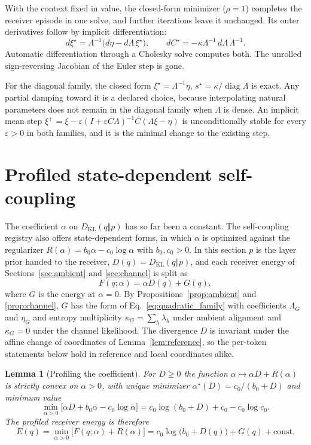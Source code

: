\documentclass[11pt]{article}
\newtheorem{lemma}[proposition]{Lemma}
\theoremstyle{definition}
\theoremstyle{remark}
\newcommand{\KL}{D_{\mathrm{KL}}}
\newcommand{\diag}{\operatorname{diag}}
\begin{document}
With the context fixed in value, the closed-form minimizer ($\rho=1$) completes the receiver episode in one solve, and further iterations leave it unchanged. Its outer derivatives follow by implicit differentiation:
\begin{equation}
d\xi^\star=\Lambda^{-1}\bigl(d\eta-d\Lambda\,\xi^\star\bigr),\qquad dC^\star=-\kappa\Lambda^{-1}\,d\Lambda\,\Lambda^{-1}.
\end{equation}
Automatic differentiation through a Cholesky solve computes both. The unrolled sign-reversing Jacobian of the Euler step is gone.

For the diagonal family, the closed form $\xi^\star=\Lambda^{-1}\eta$, $s^\star=\kappa/\diag\Lambda$ is exact. Any partial damping toward it is a declared choice, because interpolating natural parameters does not remain in the diagonal family when $\Lambda$ is dense. An implicit mean step $\xi^+=\xi-\varepsilon(I+\varepsilon C\Lambda)^{-1}C(\Lambda\xi-\eta)$ is unconditionally stable for every $\varepsilon>0$ in both families, and it is the minimal change to the existing step.

\section{Profiled state-dependent self-coupling}
\label{sec:profiled}

The coefficient $\alpha$ on $\KL(q\Vert p)$ has so far been a constant. The self-coupling registry also offers state-dependent forms, in which $\alpha$ is optimized against the regularizer $R(\alpha)=b_0\alpha-c_0\log\alpha$ with $b_0,c_0>0$. In this section $p$ is the layer prior handed to the receiver, $D(q)=\KL(q\Vert p)$, and each receiver energy of Sections~\ref{sec:ambient} and \ref{sec:channel} is split as
\begin{equation}
F(q;\alpha)=\alpha D(q)+G(q),
\label{eq:split}
\end{equation}
where $G$ is the energy at $\alpha=0$. By Propositions~\ref{prop:ambient} and \ref{prop:channel}, $G$ has the form of Eq.~\eqref{eq:quadratic_family} with coefficients $\Lambda_G$ and $\eta_G$ and entropy multiplicity $\kappa_G=\sum_h\lambda_h$ under ambient alignment and $\kappa_G=0$ under the channel likelihood. The divergence $D$ is invariant under the affine change of coordinates of Lemma~\ref{lem:reference}, so the per-token statements below hold in reference and local coordinates alike.

\begin{lemma}[Profiling the coefficient]
\label{lem:profile}
For $D\ge0$ the function $\alpha\mapsto\alpha D+R(\alpha)$ is strictly convex on $\alpha>0$, with unique minimizer $\alpha^\star(D)=c_0/(b_0+D)$ and minimum value
\begin{equation}
\min_{\alpha>0}\bigl[\alpha D+b_0\alpha-c_0\log\alpha\bigr]=c_0\log(b_0+D)+c_0-c_0\log c_0.
\end{equation}
The profiled receiver energy is therefore
\begin{equation}
E(q)=\min_{\alpha>0}\bigl[F(q;\alpha)+R(\alpha)\bigr]=c_0\log\bigl(b_0+D(q)\bigr)+G(q)+\text{const}.
\label{eq:profiled}
\end{equation}
\end{lemma}
\end{document}

